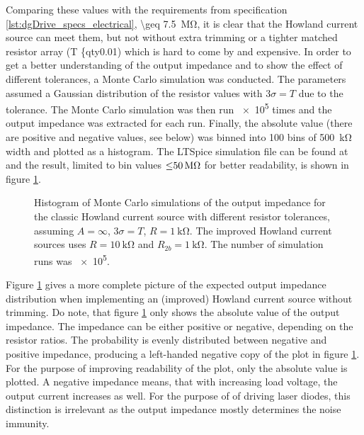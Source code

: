 Comparing these values with the requirements from specification \ref{lst:dgDrive_specs_electrical}, \qty{\geq 7.5}{\mega \ohm}, it is clear that the Howland current source can meet them, but not without extra trimming or a tighter matched resistor array (T \{qty{0.01}{\percent}) which is hard to come by and expensive. In order to get a better understanding of the output impedance and to show the effect of different tolerances, a Monte Carlo simulation was conducted. The parameters assumed a Gaussian distribution of the resistor values with $3 \sigma = T$ due to the tolerance. The Monte Carlo simulation was then run \num{e5} times and the output impedance was extracted for each run. Finally, the absolute value (there are positive and negative values, see below) was binned into \num{100} bins of \qty{500}{\kilo\ohm} width and plotted as a histogram. The LTSpice simulation file can be found at  and the result, limited to bin values $\qty{\leq 50}{\mega\ohm}$ for better readability, is shown in figure \ref{fig:ltpsice_howland_mc_output_impedance}.
\begin{figure}[ht]
    \centering
    
    \caption{Histogram of Monte Carlo simulations of the output impedance for the classic Howland current source with different resistor tolerances, assuming $A = \infty$, $3 \sigma = T$, $R=\qty{1}{\kilo\ohm}$. The improved Howland current sources uses $R = \qty{10}{\kilo\ohm}$ and $R_{2b} = \qty{1}{\kilo\ohm}$. The number of simulation runs was \num{e5}.}
    \label{fig:ltpsice_howland_mc_output_impedance}
\end{figure}

Figure \ref{fig:ltpsice_howland_mc_output_impedance} gives a more complete picture of the expected output impedance distribution when implementing an (improved) Howland current source without trimming. Do note, that figure \ref{fig:ltpsice_howland_mc_output_impedance} only shows the absolute value of the output impedance. The impedance can be either positive or negative, depending on the resistor ratios. The probability is evenly distributed between negative and positive impedance, producing a left-handed negative copy of the plot in figure \ref{fig:ltpsice_howland_mc_output_impedance}. For the purpose of improving readability of the plot, only the absolute value is plotted. A negative impedance means, that with increasing load voltage, the output current increases as well. For the purpose of of driving laser diodes, this distinction is irrelevant as the output impedance mostly determines the noise immunity.

